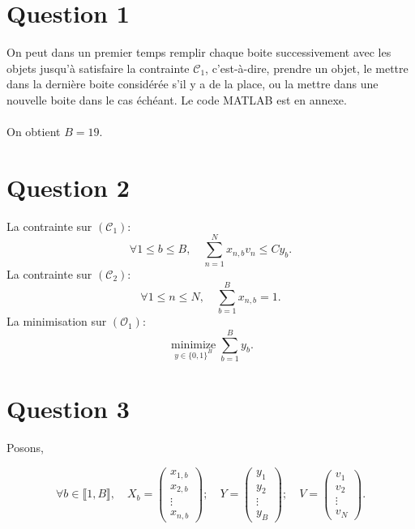 \section{Question 1}
On peut dans un premier temps remplir chaque boite successivement avec les objets jusqu'à satisfaire la contrainte $\mathcal{C}_1$, c'est-à-dire, prendre un objet, le mettre dans la dernière boite considérée s'il y a de la place, ou la mettre dans une nouvelle boite dans le cas échéant. Le code MATLAB est en annexe. \\ \\
On obtient $\boxed{B = 19.}$

\section{Question 2}
La contrainte sur $(\mathcal{C}_1)$: 
$$ \forall 1 \leq b \leq B, \quad \sum_{n=1}^N x_{n,b}v_n \leq Cy_b.$$
La contrainte sur $(\mathcal{C}_2)$:
$$ \forall 1 \leq n \leq N, \quad \sum_{b=1}^B x_{n,b} = 1.$$
La minimisation sur $(\mathcal{O}_1)$: 
$$ \underset{y \in \{0, 1\}^{B}}{\operatorname{minimize}} \sum_{b=1}^B y_b.$$

\section{Question 3}

Posons,

\[
\forall b \in \llbracket 1, B \rrbracket, \quad
X_b = \begin{pmatrix}
    x_{1,b} \\
    x_{2,b} \\
    \vdots \\
    x_{n,b}
\end{pmatrix}; \quad
Y = \begin{pmatrix}
    y_{1} \\
    y_{2} \\
    \vdots \\
    y_{B}
\end{pmatrix}; \quad
V = \begin{pmatrix}
    v_{1} \\
    v_{2} \\
    \vdots \\
    v_{N}
\end{pmatrix}.
\]

